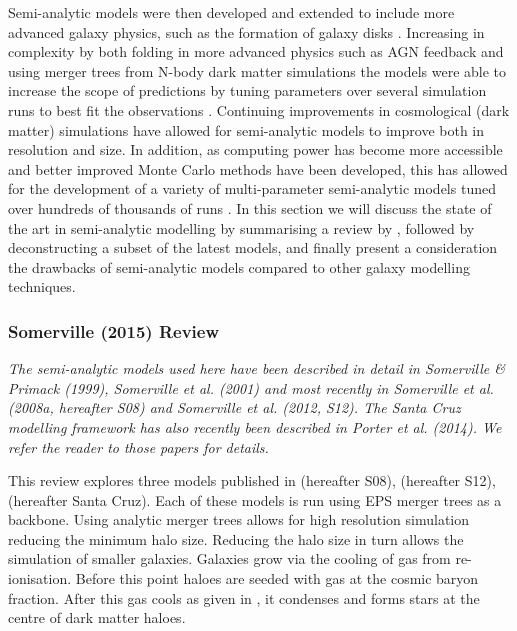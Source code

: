 
Semi-analytic models were then developed and extended to include more advanced galaxy physics, such as the formation of galaxy disks \citep{Mo1998TheDiscs}. Increasing in complexity by both folding in more advanced physics such as AGN feedback and using merger trees from N-body dark matter simulations the models were able to increase the scope of predictions by tuning parameters over several simulation runs to best fit the observations \citep{Bower2006BreakingFormation}. Continuing improvements in cosmological (dark matter) simulations have allowed for semi-analytic models to improve both in resolution and size. In addition, as computing power has become more accessible and better improved Monte Carlo methods have been developed, this has allowed for the development of a variety of multi-parameter semi-analytic models tuned over hundreds of thousands of runs \citep{Guo2011FromCosmology,DeLucia2011TimesCosmology,Fontanot2011TheUniverse,Menci2014TriggeringInteractions,Somerville2015StarGas}.
In this section we will discuss the state of the art in semi-analytic modelling by summarising a review by \citet{Somerville2015StarGas}, followed by deconstructing a subset of the latest models, and finally present a consideration the drawbacks of semi-analytic models compared to other galaxy modelling techniques.

\subsubsection{Somerville (2015) Review \citep{Somerville2015StarGas}}
\textit{The semi-analytic models used here have been described in detail in Somerville \& Primack (1999), Somerville et al. (2001) and most recently in Somerville et al. (2008a, hereafter S08) and Somerville et al. (2012, S12). The Santa Cruz modelling framework has also recently been described in Porter et al. (2014). We refer the reader to those papers for details.}

This review explores three models published in \citet{Somerville2008ANuclei} (hereafter S08), \citet{Somerville2012GalaxyObservations} (hereafter S12), \citet{Porter2014ModellingSpace} (hereafter Santa Cruz). Each of these models is run using EPS merger trees as a backbone. Using analytic merger trees allows for high resolution simulation reducing the minimum halo size. Reducing the halo size in turn allows the simulation of smaller galaxies. Galaxies grow via the cooling of gas from re-ionisation. Before this point haloes are seeded with gas at the cosmic baryon fraction. After this gas cools as given in \cite{White1991GalaxyClustering}, it condenses and forms stars at the centre of dark matter haloes. 

